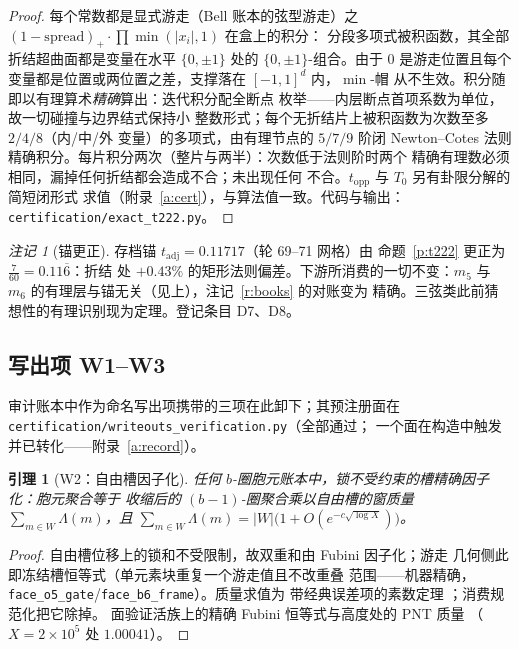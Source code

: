 \documentclass[11pt]{article}
\numberwithin{equation}{section}
\newtheorem{lemma}[theorem]{引理}
\theoremstyle{definition}
\theoremstyle{remark}
\newtheorem{remark}[theorem]{注记}
\newcommand{\LL}{\Lambda}
\begin{document}
\begin{proof}
每个常数都是显式游走（Bell 账本的弦型游走）之
$(1-\mathrm{spread})_+\cdot\prod\min(|x_i|,1)$ 在盒上的积分：
分段多项式被积函数，其全部折结超曲面都是变量在水平
$\{0,\pm1\}$ 处的 $\{0,\pm1\}$-组合。由于 $0$ 是游走位置且每个
变量都是位置或两位置之差，支撑落在 $[-1,1]^d$ 内，$\min$-帽
从不生效。积分随即以有理算术\emph{精确}算出：迭代积分配全断点
枚举——内层断点首项系数为单位，故一切碰撞与边界结式保持小
整数形式；每个无折结片上被积函数为次数至多 $2/4/8$（内/中/外
变量）的多项式，由有理节点的 $5/7/9$ 阶闭 Newton--Cotes 法则
精确积分。每片积分两次（整片与两半）：次数低于法则阶时两个
精确有理数必须相同，漏掉任何折结都会造成不合；未出现任何
不合。$t_{\mathrm{opp}}$ 与 $T_0$ 另有卦限分解的简短闭形式
求值（附录~\ref{a:cert}），与算法值一致。代码与输出：
\texttt{certification/exact\_t222.py}。
\end{proof}

\begin{remark}[锚更正]\label{r:anchor}
存档锚 $t_{\mathrm{adj}}=0.11717$（轮 69--71 网格）由
命题~\ref{p:t222} 更正为 $\tfrac7{60}=0.11\overline{6}$：折结
处 $+0.43\%$ 的矩形法则偏差。下游所消费的一切不变：$m_5$ 与
$m_6$ 的有理层与锚无关（见上），注记~\ref{r:books} 的对账变为
精确。三弦类此前猜想性的有理识别现为定理。登记条目 D7、D8。
\end{remark}

\subsection{写出项 W1--W3}\label{s:writeouts}

审计账本中作为命名写出项携带的三项在此卸下；其预注册面在 \\
\texttt{certification/writeouts\_verification.py}（全部通过；
一个面在构造中触发并已转化——附录~\ref{a:record}）。

\begin{lemma}[W2：自由槽因子化]\label{l:W2}
任何 $b$-圈胞元账本中，锁不受约束的槽精确因子化：胞元聚合等于
收缩后的 $(b-1)$-圈聚合乘以自由槽的窗质量
$\sum_{m\in W}\LL(m)$，且
$\sum_{m\in W}\LL(m)=|W|\bigl(1+O(e^{-c\sqrt{\log X}})\bigr)$。
\end{lemma}

\begin{proof}
自由槽位移上的锁和不受限制，故双重和由 Fubini 因子化；游走
几何侧此即冻结槽恒等式（单元素块重复一个游走值且不改重叠
范围——机器精确，
\texttt{face\_o5\_gate}/\texttt{face\_b6\_frame}）。质量求值为
带经典误差项的素数定理 \cite[\S18]{Dav}；消费规范化把它除掉。
面验证活族上的精确 Fubini 恒等式与高度处的 PNT 质量
（$X=2\times10^{5}$ 处 $1.00041$）。
\end{proof}
\end{document}
